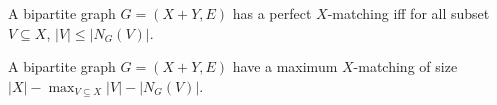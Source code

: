 A bipartite graph $G = (X+Y, E)$ has a perfect $X$-matching iff for all subset $V \subseteq X$, $|V| \le |N_G(V)|$.

A bipartite graph $G = (X+Y, E)$ have a maximum $X$-matching of size $|X| - \max_{V \subseteq X} |V| - |N_G(V)|$.